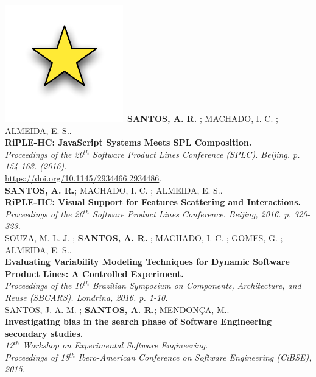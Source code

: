 \documentclass[nocolors]{friggeri-cv-a4}
\begin{document}
\includegraphics[scale=.15]{img/star.pdf}~\textbf{SANTOS, A. R.} ; MACHADO, I. C. ; ALMEIDA, E. S..\\ 
\textbf{RiPLE-HC: JavaScript Systems Meets SPL Composition.}\\
\emph{Proceedings of the 20$^{th}$ Software Product Lines Conference (SPLC). Beijing. p. 154-163. (2016).}\\
 \url{https://doi.org/10.1145/2934466.2934486}.\\

\textbf{SANTOS, A. R.}; MACHADO, I. C. ; ALMEIDA, E. S..\\
\textbf{RiPLE-HC: Visual Support for Features Scattering and Interactions.} \\
\emph{Proceedings of the 20$^{th}$ Software Product Lines Conference. Beijing, 2016. p. 320-323.}\\

SOUZA, M. L. J. ; \textbf{SANTOS, A. R.} ; MACHADO, I. C. ; GOMES, G. ; ALMEIDA, E. S..\\
\textbf{Evaluating Variability Modeling Techniques for Dynamic Software Product Lines: A Controlled Experiment.} \\
\emph{Proceedings of the 10$^{th}$ Brazilian Symposium on Components, Architecture, and Reuse (SBCARS). Londrina, 2016. p. 1-10.}\\

SANTOS, J. A. M. ; \textbf{SANTOS, A. R.}; MENDON\c{C}A, M.. \\
\textbf{Investigating bias in the search phase of Software Engineering secondary studies.} \\
\emph{12$^{th}$ Workshop on Experimental Software Engineering. \\
	Proceedings of 18$^{th}$ Ibero-American Conference on Software Engineering (CiBSE), 2015.}\\
\end{document}
